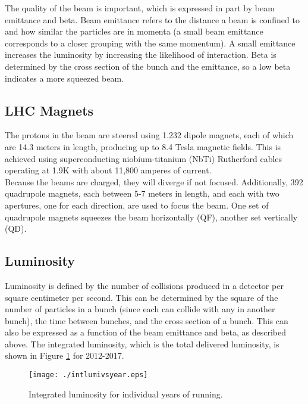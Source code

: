 The quality of the beam is important, which is expressed in part by beam emittance and beta.  Beam emittance refers to the distance a beam is confined to and how similar the particles are in momenta (a small beam emittance corresponds to a closer grouping with the same momentum).  A small emittance increases the luminosity by increasing the likelihood of interaction.  Beta is determined by the cross section of the bunch and the emittance, so a low beta indicates a more squeezed beam.\\


\subsection{LHC Magnets}

The protons in the beam are steered using 1.232 dipole magnets, each of which are 14.3 meters in length, producing up to 8.4 Tesla magnetic fields.  This is achieved using superconducting niobium-titanium (NbTi) Rutherford cables operating at 1.9K with about 11,800 amperes of current.  \\

Because the beams are charged, they will diverge if not focused.  Additionally, 392 quadrupole magnets, each between 5-7 meters in length, and each with two apertures, one for each direction, are used to focus the beam.  One set of quadrupole magnets squeezes the beam horizontally (QF), another set vertically (QD). \\%

\subsection{Luminosity}

Luminosity is defined by the number of collisions produced in a detector per square centimeter per second.  This can be determined by the square of the number of particles in a bunch (since each can collide with any in another bunch), the time between bunches, and the cross section of a bunch.  This can also be expressed as a function of the beam emittance and beta, as described above.  The integrated luminosity, which is the total delivered luminosity, is shown in Figure \ref{fig:intLum} for 2012-2017.\\

\begin{figure}[h!]
  \centering
	\texttt{[image: ./intlumivsyear.eps]}
\caption{\label{fig:intLum}{ Integrated luminosity for individual years of running. }} %
\end{figure}


